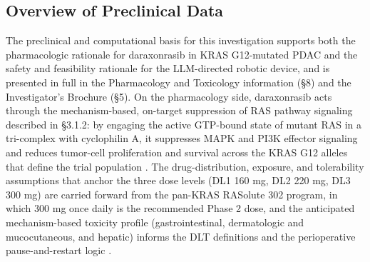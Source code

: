 
\subsection{Overview of Preclinical Data}

The preclinical and computational basis for this investigation supports both the
pharmacologic rationale for daraxonrasib in KRAS G12-mutated PDAC and the safety and
feasibility rationale for the LLM-directed robotic device, and is presented in full
in the Pharmacology and Toxicology information (\S 8) and the Investigator's
Brochure (\S 5). On the pharmacology side, daraxonrasib acts through the
mechanism-based, on-target suppression of RAS pathway signaling described in
\S 3.1.2: by engaging the active GTP-bound state of mutant RAS in a tri-complex with
cyclophilin A, it suppresses MAPK and PI3K effector signaling and reduces tumor-cell
proliferation and survival across the KRAS G12 alleles that define the trial
population \cite{daraxwhipple}. The drug-distribution, exposure, and tolerability
assumptions that anchor the three dose levels (DL1 160 mg, DL2 220 mg, DL3 300 mg)
are carried forward from the pan-KRAS RASolute 302 program, in which 300 mg once
daily is the recommended Phase 2 dose, and the anticipated mechanism-based toxicity
profile (gastrointestinal, dermatologic and mucocutaneous, and hepatic) informs the
DLT definitions and the perioperative pause-and-restart logic \cite{onpremwhippl}.

